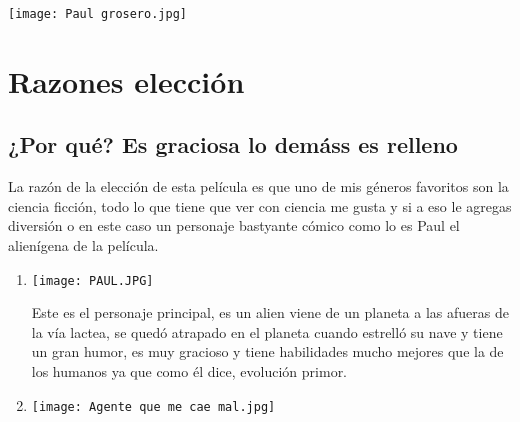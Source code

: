 \documentclass[11pt]{article}
\begin{document}
\texttt{[image: Paul grosero.jpg]} 
\newpage
\pagecolor{cyan}
\section{Razones elección}
\subsection{¿Por qué? Es graciosa lo demáss es relleno}
La razón de la elección de esta película es que uno de mis géneros favoritos son la ciencia ficción, todo lo que tiene que ver con ciencia me gusta y si a eso le agregas diversión o en este caso un personaje bastyante cómico como lo es Paul el alienígena de la película.
\begin{enumerate}
    \item \texttt{[image: PAUL.JPG]} 


\newpage
Este es el personaje principal, es un alien viene de un planeta a las afueras de la vía lactea, se quedó atrapado en el planeta cuando estrelló su nave y tiene un gran humor, es muy gracioso y tiene habilidades mucho mejores que la de los humanos ya que como él dice, evolución primor.
\item \texttt{[image: Agente que me cae mal.jpg]} 

\end{enumerate}
\end{document}
